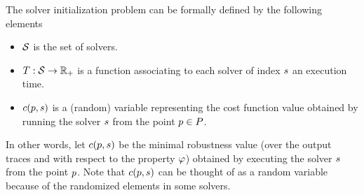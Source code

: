 The solver initialization problem can be formally defined by the following elements
\begin{itemize}
\item $\mathcal{S}$ is the set of solvers.
\item $T : \mathcal{S} \to \mathbb{R}_+$ is a function associating to each solver of index $s$ an execution time.
\item $c(p, s)$ is a (random) variable representing the cost function value obtained by running the solver $s$ from the point $p \in P$. 
\end{itemize}
In other words, let $c(p, s)$ be the minimal robustness value (over the output traces and with respect to the property $\varphi$) obtained by executing the solver $s$ from the point $p$. Note that $c(p, s)$ can be thought of as a random variable because of the randomized elements in some solvers. 



